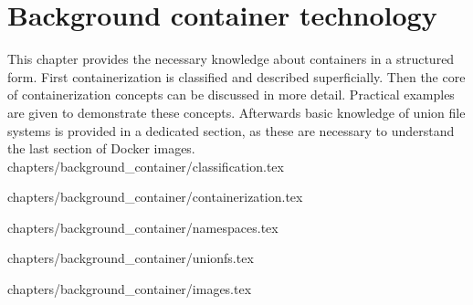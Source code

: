 \chapter{Background container technology}
\label{ch:back}

This chapter provides the necessary knowledge about containers in a structured form.
First containerization is classified and described superficially. Then the core of containerization concepts can be discussed in more detail.
Practical examples are given to demonstrate these concepts.
Afterwards basic knowledge of union file systems is provided in a dedicated section, as these are necessary to understand the last section of Docker images.
 {chapters/background_container/classification.tex}

 {chapters/background_container/containerization.tex}

 {chapters/background_container/namespaces.tex}


 {chapters/background_container/unionfs.tex}

 {chapters/background_container/images.tex}

















